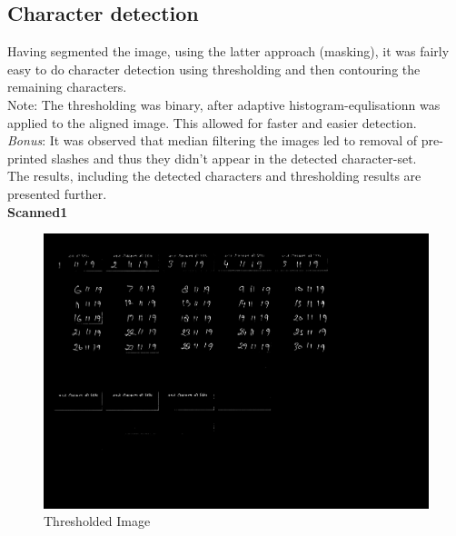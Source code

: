 \documentclass{article}
\begin{document}
    \subsection*{Character detection}
    Having segmented the image, using the latter approach (masking), it was fairly easy to do character detection using thresholding and then contouring the remaining characters.\\[1pt]
    Note: The thresholding was binary, after adaptive histogram-equlisationn was applied to the aligned image. This allowed for faster and easier detection.\\
    \textit{Bonus}: It was observed that median filtering the images led to removal of pre-printed slashes and thus they didn't appear in the detected character-set.\\
    The results, including the detected characters and thresholding results are presented further.\\
\textbf{Scanned1}
    \begin{figure}[!htb]
    \minipage{\textwidth}
    \begin{center}
      \includegraphics[scale=.15]{4/.report/_thresh/s1.jpg}
      \caption{Thresholded Image}
    \end{center}
    \endminipage
    \end{figure}
\end{document}
